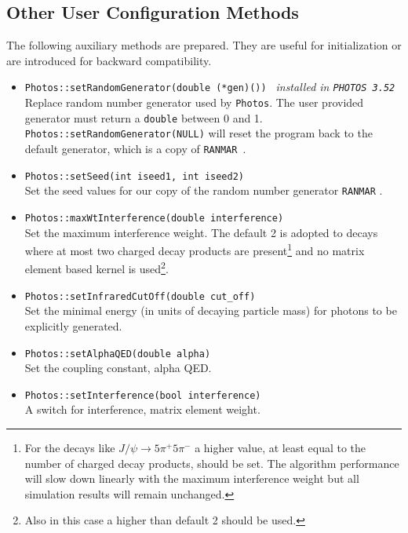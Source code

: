 \documentclass[]{Photos_interface_design}
\begin{document}
\subsection{Other User Configuration Methods}
\label{subsection:other_methods}

The following auxiliary methods are prepared. They are useful for initialization 
or are introduced for backward compatibility.

\begin{itemize}
  \item {\tt Photos::setRandomGenerator(double (*gen)()) } {\it  installed in {\tt PHOTOS 3.52}}\\
        Replace random number generator used by {\tt Photos}.
        The user provided generator   must return a {\tt double} between 0 and 1. 
        {\tt Photos::setRandomGenerator(NULL)} will reset the program back to  
        the default generator, which is a copy of {\tt RANMAR}~\cite{James:1988vf,marsaglia:1987}.
  \item {\tt Photos::setSeed(int iseed1, int iseed2)} \\
        Set the  seed values for our copy of the random number generator {\tt RANMAR} \cite{James:1988vf,marsaglia:1987}.
  \item {\tt Photos::maxWtInterference(double interference)} \\
        Set the maximum interference weight. The default 2 is adopted to decays where at most two charged decay products
        are present\footnote{For 
        the decays like $J/\psi \to 5\pi^+ 5\pi^-$ a higher value, at least equal to the number of charged decay 
        products, should be set. The algorithm performance will slow down linearly with the  maximum interference weight but all 
        simulation results will remain unchanged.   
        } and no matrix element based kernel is used\footnote{Also in this case a higher  than default 2 should be used.}.
  \item {\tt Photos::setInfraredCutOff(double cut\_off)} \\
        Set the minimal energy (in units of decaying particle mass)
        for photons to be explicitly generated.
  \item {\tt Photos::setAlphaQED(double alpha)} \\
        Set the coupling constant, alpha QED.
  \item {\tt Photos::setInterference(bool interference)} \\
        A switch for interference, matrix element weight.

\end{itemize}
\end{document}
